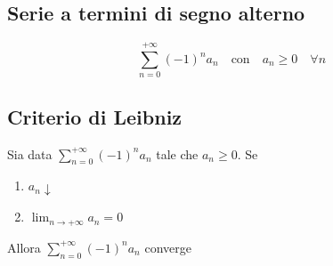 \documentclass[12pt]{article}
\begin{document}
\subsection{Serie a termini di segno alterno}
\[
\sum_{n=0}^{+\infty}(-1)^n a_n \quad \text{con} \quad a_n \geq 0 \quad \forall n
\]
\subsection{Criterio di Leibniz}
Sia data \(\displaystyle \sum_{n=0}^{+\infty}(-1)^n a_n \) tale che \(a_n \geq 0\). Se
\begin{enumerate}
  \item $a_n \downarrow$
  \item $\displaystyle \lim_{n \to +\infty} a_n = 0$
\end{enumerate}
Allora \(\displaystyle \sum_{n=0}^{+\infty}(-1)^n a_n\) converge
\end{document}
